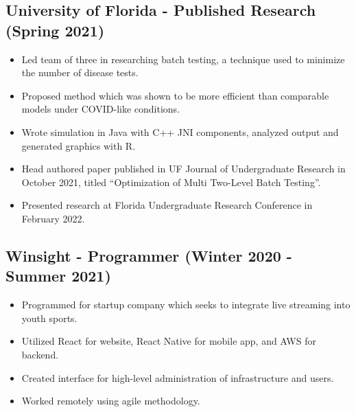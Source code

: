 \documentclass{article}
\newenvironment{CustomItemize}
{ \begin{itemize}[leftmargin=1em]
    \setlength{\itemsep}{0pt}
    \setlength{\parskip}{0pt}
    \setlength{\parindent}{0pt}
    \setlength{\parsep}{0pt}     }
{ \end{itemize}                  }
\begin{document}
\subsection{University of Florida - Published Research (Spring 2021)}
\begin{CustomItemize}
\item Led team of three in researching batch testing, a technique used to minimize the number of disease tests.
\item Proposed method which was shown to be more efficient than comparable models under COVID-like conditions.
\item Wrote simulation in Java with C++ JNI components, analyzed output and generated graphics with R.
\item Head authored paper published in UF Journal of Undergraduate Research in October 2021, titled ``Optimization of Multi Two-Level Batch Testing''.
\item Presented research at Florida Undergraduate Research Conference in February 2022.
\end{CustomItemize}

\subsection{Winsight - Programmer (Winter 2020 - Summer 2021)}
\begin{CustomItemize}
\item Programmed for startup company which seeks to integrate live streaming into youth sports.
\item Utilized React for website, React Native for mobile app, and AWS for backend.
\item Created interface for high-level administration of infrastructure and users.
\item Worked remotely using agile methodology.
\end{CustomItemize}

\end{document}
